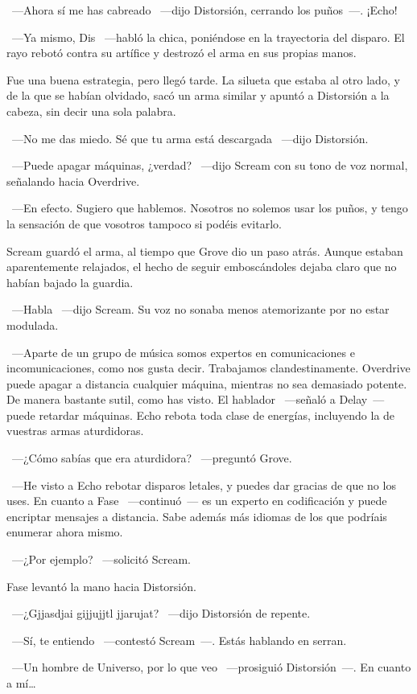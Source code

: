 ~---Ahora sí me has cabreado ~---dijo Distorsión, cerrando los puños~---. ¡Echo!

~---Ya mismo, Dis ~---habló la chica, poniéndose en la trayectoria del disparo. El rayo rebotó contra su artífice y destrozó el arma en sus propias manos.

Fue una buena estrategia, pero llegó tarde. La silueta que estaba al otro lado, y de la que se habían olvidado, sacó un arma similar y apuntó a Distorsión a la cabeza, sin decir una sola palabra.

~---No me das miedo. Sé que tu arma está descargada ~---dijo Distorsión.

~---Puede apagar máquinas, ¿verdad? ~---dijo Scream con su tono de voz normal, señalando hacia Overdrive.

~---En efecto. Sugiero que hablemos. Nosotros no solemos usar los puños, y tengo la sensación de que vosotros tampoco si podéis evitarlo.

Scream guardó el arma, al tiempo que Grove dio un paso atrás. Aunque estaban aparentemente relajados, el hecho de seguir emboscándoles dejaba claro que no habían bajado la guardia.

~---Habla ~---dijo Scream. Su voz no sonaba menos atemorizante por no estar modulada.

~---Aparte de un grupo de música somos expertos en comunicaciones e incomunicaciones, como nos gusta decir. Trabajamos clandestinamente. Overdrive puede apagar a distancia cualquier máquina, mientras no sea demasiado potente. De manera bastante sutil, como has visto. El hablador ~---señaló a Delay~--- puede retardar máquinas. Echo rebota toda clase de energías, incluyendo la de vuestras armas aturdidoras.

~---¿Cómo sabías que era aturdidora? ~---preguntó Grove.

~---He visto a Echo rebotar disparos letales, y puedes dar gracias de que no los uses. En cuanto a Fase ~---continuó~--- es un experto en codificación y puede encriptar mensajes a distancia. Sabe además más idiomas de los que podríais enumerar ahora mismo.

~---¿Por ejemplo? ~---solicitó Scream.

Fase levantó la mano hacia Distorsión.

~---¿Gjjasdjai gijjujjtl jjarujat? ~---dijo Distorsión de repente.

~---Sí, te entiendo ~---contestó Scream~---. Estás hablando en serran.

~---Un hombre de Universo, por lo que veo ~---prosiguió Distorsión~---. En cuanto a mí\dots

